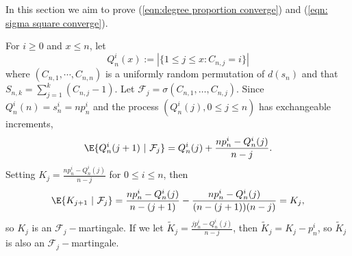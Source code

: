 In this section we aim to prove (\ref{eqn:degree proportion converge}) and (\ref{eqn: sigma square converge}). 


For $i\ge 0$ and $x\le n$, let
\[Q^i_n(x)\!:=|\{1\le j\le x: C_{n,j}=i\}|\] where $(C_{n,1}, \cdots, C_{n,n})$ is a uniformly random permutation of $d(s_n)$ and that $S_{n,k} = \sum_{j=1}^k (C_{n,j}-1)$. Let $\mathcal{F}_j=\sigma(C_{n,1},\ldots, C_{n,j})$. Since $Q^i_n(n)=s^i_n=np^i_n$ and the process $(Q^i_n(j), 0\le j\le n)$ has exchangeable increments,
\[\E{Q^i_n(j+1)~|~\mathcal{F}_j}=Q^i_n(j)+\frac{np^i_n-Q^i_n(j)}{n-j}.\]
Setting $K_j=\frac{np^i_n-Q^i_n(j)}{n-j}$ for $0\le i\le n$, then \[\E{K_{j+1}~|~\mathcal{F}_j}=\frac{np^i_n-Q^i_n(j)}{n-(j+1)}-\frac{np^i_n-Q^i_n(j)}{(n-(j+1))(n-j)}=K_j,\] so $K_j$ is an $\mathcal{F}_j-$martingale. If we let $\tilde{K}_j=\frac{jp^i_n-Q^i_n(j)}{n-j}$, then $\tilde{K}_j=K_j-p^i_n$, so $\tilde{K}_j$ is also an $\mathcal{F}_j-$martingale. 

%
%
%


